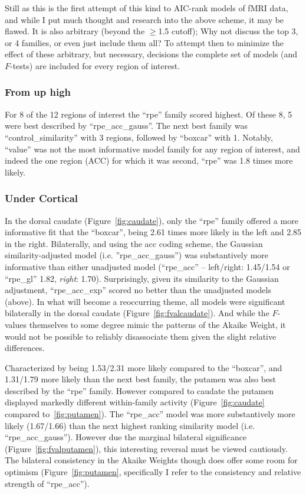 \documentclass[doc,12pt]{apa}        %
\begin{document}
Still as this is the first attempt of this kind to AIC-rank models of fMRI data, and while I put much thought and research into the above scheme, it may be flawed.  It is also arbitrary (beyond the $\ge$1.5 cutoff); Why not discuss the top 3, or 4 families, or even just include them all?  To attempt then to minimize the effect of these arbitrary, but necessary, decisions the complete set of models (and $F$-tests) are included for every region of interest.


\subsubsection{From up high}
\label{subsub:fromuphigh}
For 8 of the 12 regions of interest the ``rpe'' family scored highest.  Of these 8, 5 were best described by ``rpe\_acc\_gauss''.  The next best family was ``control\_similarity'' with 3 regions, followed by ``boxcar'' with 1.  Notably, ``value'' was not the most informative model family for any region of interest, and indeed the one region (ACC) for which it was second, ``rpe'' was 1.8 times more likely.


\subsubsection{Under Cortical}
\label{subsub:belowctx}
In the dorsal caudate (Figure~\ref{fig:caudate}), only the ``rpe'' family offered a more informative fit that the ``boxcar'', being 2.61 times more likely in the left and 2.85 in the right.  Bilaterally, and using the acc coding scheme, the Gaussian similarity-adjusted model (i.e. ''rpe\_acc\_gauss'') was substantively more informative than either unadjusted model (``rpe\_acc'' -- left/right: 1.45/1.54 or ``rpe\_gl'' 1.82, \emph{right}: 1.70).  Surprisingly, given its similarity to the Gaussian adjustment, ``rpe\_acc\_exp'' scored no better than the unadjusted models (above).  In what will become a reoccurring theme, all models were significant bilaterally in the dorsal caudate (Figure~\ref{fig:fvalcaudate}).  And while the $F$-values themselves to some degree mimic the patterns of the Akaike Weight, it would not be possible to reliably disassociate them given the slight relative differences.  

Characterized by being 1.53/2.31 more likely compared to the ``boxcar'', and 1.31/1.79 more likely than the next best family, the putamen was also best described by the ``rpe'' family.  However compared to caudate the putamen displayed markedly different within-family activity (Figure~\ref{fig:caudate} compared to~\ref{fig:putamen}). The ``rpe\_acc'' model was more substantively more likely (1.67/1.66) than the next highest ranking similarity model (i.e. ``rpe\_acc\_gauss'').  However due the marginal bilateral significance (Figure~\ref{fig:fvalputamen}), this interesting reversal must be viewed cautiously.  The bilateral consistency in the Akaike Weights though does offer some room for optimism (Figure~\ref{fig:putamen}, specifically I refer to the consistency and relative strength of ``rpe\_acc'').
\end{document}
